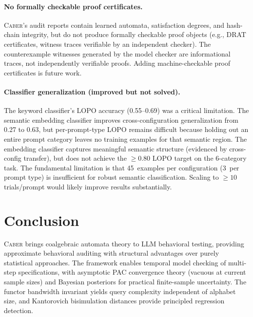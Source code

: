 \documentclass[11pt]{article}
\newcommand{\tool}{\textsc{Caber}}
\begin{document}
\paragraph{No formally checkable proof certificates.}
\tool{}'s audit reports contain learned automata, satisfaction degrees,
and hash-chain integrity, but do not produce formally checkable proof
objects (e.g., DRAT certificates, witness traces verifiable by an
independent checker).  The counterexample witnesses generated by the
model checker are informational traces, not independently verifiable
proofs.  Adding machine-checkable proof certificates is future work.

\paragraph{Classifier generalization (improved but not solved).}
The keyword classifier's LOPO accuracy (0.55--0.69) was a critical
limitation.  The semantic embedding classifier improves
cross-configuration generalization from 0.27 to 0.63, but
per-prompt-type LOPO remains difficult because holding out
an entire prompt category leaves no training examples for that
semantic region.  The embedding classifier captures
meaningful semantic structure (evidenced by cross-config transfer),
but does not achieve the ${\ge}0.80$ LOPO target on the
6-category task.  The fundamental limitation is that 45~examples
per configuration (3~per prompt type) is insufficient for
robust semantic classification.  Scaling to ${\ge}10$ trials/prompt
would likely improve results substantially.

\section{Conclusion}\label{sec:conclusion}

\tool{} brings coalgebraic automata theory to LLM behavioral testing,
providing approximate behavioral auditing with structural advantages
over purely statistical approaches.
The framework enables temporal model checking of multi-step specifications,
with asymptotic PAC convergence theory (vacuous at current sample sizes)
and Bayesian posteriors for practical finite-sample uncertainty.
The functor bandwidth invariant yields query
complexity independent of alphabet size, and Kantorovich bisimulation
distances provide principled regression detection.
\end{document}
